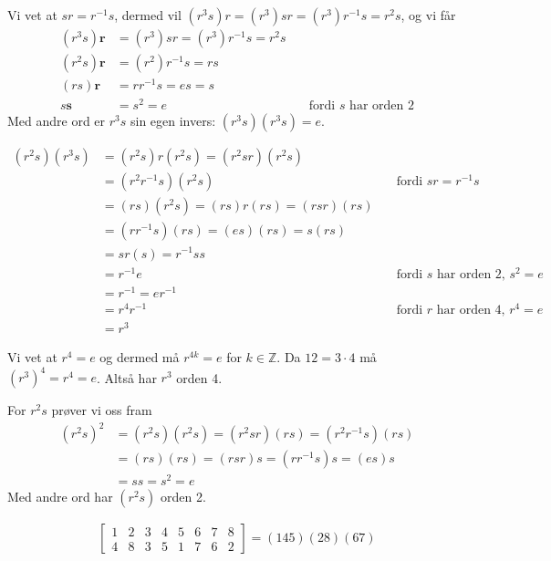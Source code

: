 \documentclass[a4paper,norsk,12pt]{article}
\begin{document}
Vi vet at $sr=r^{-1}s$, dermed vil $(r^3s)r = (r^3)sr = (r^3)r^{-1}s = r^2s$,
og vi får
\begin{align*}
  (r^3s)\mathbf{r} &= (r^3)sr = (r^3)r^{-1}s = r^2s \\
  (r^2s)\mathbf{r} &= (r^2)r^{-1}s = rs \\
  (rs)\mathbf{r} &= rr^{-1}s = es = s \\
  s\mathbf{s} &= s^2 = e & \quad\text{fordi $s$ har orden 2}
\end{align*}
Med andre ord er $r^3s$ sin egen invers: $(r^3s)(r^3s) = e$.

\begin{align*}
  (r^2s)(r^3s) &= (r^2s)r(r^2s) = (r^2sr)(r^2s) \\
               &= (r^2r^{-1}s)(r^2s)  & \quad\text{fordi } sr=r^{-1}s \\
               &= (rs)(r^2s) = (rs)r(rs) = (rsr)(rs) \\
               &= (rr^{-1}s)(rs) = (es)(rs) = s(rs) \\
               &= sr(s) = r^{-1}ss \\
               &= r^{-1}e & \quad\text{fordi $s$ har orden 2, } s^2=e \\
               &= r^{-1} = er^{-1} \\
               &= r^4r^{-1} & \quad\text{fordi $r$ har orden 4, } r^4=e \\
               &= r^3
\end{align*}

Vi vet at $r^4=e$ og dermed må $r^{4k}=e$ for $k\in\mathbb{Z}$. Da $12 = 3\cdot4$ må
$(r^3)^4=r^4=e$. Altså har $r^3$ orden 4.

For $r^2s$ prøver vi oss fram
\begin{align*}
  (r^2s)^2 &= (r^2s)(r^2s) = (r^2sr)(rs) = (r^2r^{-1}s)(rs) \\
           &= (rs)(rs) = (rsr)s = (rr^{-1}s)s = (es)s \\
           &= ss = s^2 = e
\end{align*}
Med andre ord har $(r^2s)$ orden 2.

\begin{align*}
  \left[\begin{matrix}
      1 & 2 & 3 & 4 & 5 & 6 & 7 & 8 \\
      4 & 8 & 3 & 5 & 1 & 7 & 6 & 2
  \end{matrix}\right] = 
  (145)(28)(67)
\end{align*}

\end{document}
